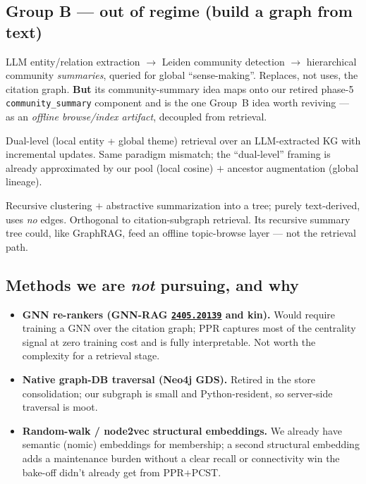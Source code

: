 \documentclass[11pt]{article}
\newcommand{\code}[1]{\texttt{\small #1}}
\newcommand{\arxiv}[1]{\href{https://arxiv.org/abs/#1}{\texttt{#1}}}
\begin{document}
\subsection{Group B --- out of regime (build a graph from text)}
\begin{description}[leftmargin=0pt,itemsep=4pt]
  \item[GraphRAG, Microsoft (\arxiv{2404.16130}).] LLM entity/relation extraction $\to$ Leiden
  community detection $\to$ hierarchical community \emph{summaries}, queried for global
  ``sense-making''. Replaces, not uses, the citation graph. \textbf{But} its community-summary idea
  maps onto our retired phase-5 \code{community\_summary} component and is the one Group~B idea worth
  reviving --- as an \emph{offline browse/index artifact}, decoupled from retrieval.
  \item[LightRAG (\arxiv{2410.05779}).] Dual-level (local entity + global theme) retrieval over an
  LLM-extracted KG with incremental updates. Same paradigm mismatch; the ``dual-level'' framing is
  already approximated by our pool (local cosine) $+$ ancestor augmentation (global lineage).
  \item[RAPTOR (\arxiv{2401.18059}).] Recursive clustering $+$ abstractive summarization into a tree;
  purely text-derived, uses \emph{no} edges. Orthogonal to citation-subgraph retrieval. Its recursive
  summary tree could, like GraphRAG, feed an offline topic-browse layer --- not the retrieval path.
\end{description}

\subsection{Methods we are \emph{not} pursuing, and why}
\begin{itemize}[leftmargin=1.4em,itemsep=2pt]
  \item \textbf{GNN re-rankers (GNN-RAG \arxiv{2405.20139} and kin).} Would require training a GNN
  over the citation graph; PPR captures most of the centrality signal at zero training cost and is
  fully interpretable. Not worth the complexity for a retrieval stage.
  \item \textbf{Native graph-DB traversal (Neo4j GDS).} Retired in the store consolidation; our
  subgraph is small and Python-resident, so server-side traversal is moot.
  \item \textbf{Random-walk / node2vec structural embeddings.} We already have semantic (nomic)
  embeddings for membership; a second structural embedding adds a maintenance burden without a clear
  recall or connectivity win the bake-off didn't already get from PPR$+$PCST.
\end{itemize}
\end{document}

